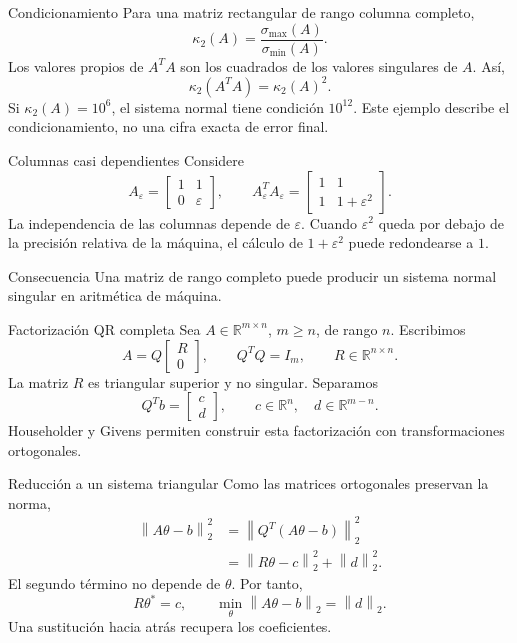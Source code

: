 \documentclass[aspectratio=169,12pt]{beamer}
\newcommand{\R}{\mathbb{R}}
\newcommand{\mat}[1]{\begin{bmatrix}#1\end{bmatrix}}
\newcommand{\norm}[1]{\left\lVert#1\right\rVert}
\begin{document}
\begin{frame}{Condicionamiento}
Para una matriz rectangular de rango columna completo,
\[
\kappa_2(A)=\frac{\sigma_{\max}(A)}{\sigma_{\min}(A)}.
\]
Los valores propios de $A^TA$ son los cuadrados de los valores singulares de $A$.
Así,
\[
\boxed{\kappa_2(A^TA)=\kappa_2(A)^2.}
\]
Si $\kappa_2(A)=10^6$, el sistema normal tiene condición $10^{12}$.
Este ejemplo describe el condicionamiento, no una cifra exacta de error final.
\end{frame}

\begin{frame}{Columnas casi dependientes}
Considere
\[
A_\varepsilon=\mat{1&1\\0&\varepsilon},\qquad
A_\varepsilon^TA_\varepsilon
=\mat{1&1\\1&1+\varepsilon^2}.
\]
La independencia de las columnas depende de $\varepsilon$.
Cuando $\varepsilon^2$ queda por debajo de la precisión relativa de la máquina,
el cálculo de $1+\varepsilon^2$ puede redondearse a $1$.
\begin{block}{Consecuencia}
Una matriz de rango completo puede producir un sistema normal singular
en aritmética de máquina.
\end{block}
\end{frame}

\begin{frame}{Factorización QR completa}
Sea $A\in\R^{m\times n}$, $m\geq n$, de rango $n$. Escribimos
\[
A=Q\mat{R\\0},\qquad
Q^TQ=I_m,\qquad R\in\R^{n\times n}.
\]
La matriz $R$ es triangular superior y no singular. Separamos
\[
Q^Tb=\mat{c\\d},\qquad c\in\R^n,\quad d\in\R^{m-n}.
\]
Householder y Givens permiten construir esta factorización con transformaciones ortogonales.
\end{frame}

\begin{frame}{Reducción a un sistema triangular}
Como las matrices ortogonales preservan la norma,
\[
\begin{aligned}
\norm{A\theta-b}_2^2
&=\norm{Q^T(A\theta-b)}_2^2\\
&=\norm{R\theta-c}_2^2+\norm{d}_2^2.
\end{aligned}
\]
El segundo término no depende de $\theta$. Por tanto,
\[
\boxed{R\theta^*=c},\qquad
\boxed{\min_\theta\norm{A\theta-b}_2=\norm{d}_2}.
\]
Una sustitución hacia atrás recupera los coeficientes.
\end{frame}
\end{document}
